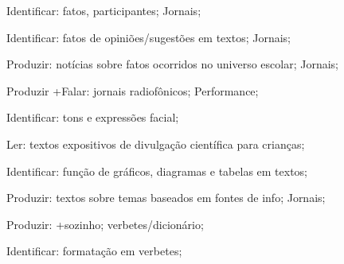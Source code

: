  Identificar: fatos, participantes; Jornais;

 Identificar: fatos de opiniões/sugestões em textos; Jornais;

 Produzir: notícias sobre fatos ocorridos no universo escolar; Jornais;

 Produzir +Falar: jornais radiofônicos; Performance;  

 Identificar: tons e expressões facial;

 Ler: textos expositivos de divulgação científica para crianças; 

 Identificar: função de gráficos, diagramas e tabelas em textos;

 Produzir: textos sobre temas baseados em fontes de info; Jornais;

 Produzir: +sozinho; verbetes/dicionário;

 Identificar: formatação em verbetes; 


